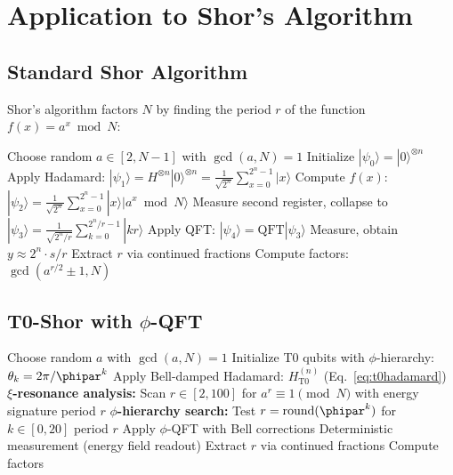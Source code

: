 \section{Application to Shor's Algorithm}
\label{sec:shor}

\subsection{Standard Shor Algorithm}

Shor's algorithm factors $N$ by finding the period $r$ of the function $f(x) = a^x \bmod N$:

\begin{algorithm}[H]
	\caption{Standard Shor Algorithm}
	\begin{algorithmic}[1]
		\STATE Choose random $a \in [2, N-1]$ with $\gcd(a, N) = 1$
		\STATE Initialize $|\psi_0\rangle = |0\rangle^{\otimes n}$
		\STATE Apply Hadamard: $|\psi_1\rangle = H^{\otimes n}|0\rangle^{\otimes n} = \frac{1}{\sqrt{2^n}}\sum_{x=0}^{2^n-1}|x\rangle$
		\STATE Compute $f(x)$: $|\psi_2\rangle = \frac{1}{\sqrt{2^n}}\sum_{x=0}^{2^n-1}|x\rangle|a^x \bmod N\rangle$
		\STATE Measure second register, collapse to $|\psi_3\rangle = \frac{1}{\sqrt{2^n/r}}\sum_{k=0}^{2^n/r-1}|kr\rangle$
		\STATE Apply QFT: $|\psi_4\rangle = \text{QFT}|\psi_3\rangle$
		\STATE Measure, obtain $y \approx 2^n \cdot s/r$
		\STATE Extract $r$ via continued fractions
		\STATE Compute factors: $\gcd(a^{r/2} \pm 1, N)$
	\end{algorithmic}
\end{algorithm}

\subsection{T0-Shor with $\phi$-QFT}

\begin{algorithm}[H]
	\caption{T0-Shor Algorithm}
	\begin{algorithmic}[1]
		\STATE Choose random $a$ with $\gcd(a, N) = 1$
		\STATE Initialize T0 qubits with $\phi$-hierarchy: $\theta_k = 2\pi/\phipar^k$
		\STATE Apply Bell-damped Hadamard: $H_{\text{T0}}^{(n)}$ (Eq.~\ref{eq:t0hadamard})
		\STATE \textbf{$\xi$-resonance analysis:} Scan $r \in [2, 100]$ for $a^r \equiv 1 \pmod{N}$ with energy signature
		 \RETURN period $r$
		\ENDIF
		\STATE \textbf{$\phi$-hierarchy search:} Test $r = \text{round}(\phipar^k)$ for $k \in [0, 20]$
		 \RETURN period $r$
		\ENDIF
		\STATE Apply $\phi$-QFT with Bell corrections
		\STATE Deterministic measurement (energy field readout)
		\STATE Extract $r$ via continued fractions
		\STATE Compute factors
	\end{algorithmic}
\end{algorithm}

